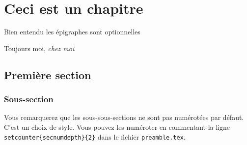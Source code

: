 \chapter{Ceci est un chapitre}

\epigraph{Bien entendu les épigraphes sont optionnelles}{Toujours moi, \textit{chez moi}}

\section{Première section}


\subsection{Sous-section}
Vous remarquerez que les sous-sous-sections ne sont pas numérotées par défaut. C'est un choix de style. Vous pouvez les numéroter en commentant la ligne \texttt{\\setcounter\{secnumdepth\}\{2\}} dans le fichier \texttt{preamble.tex}.

